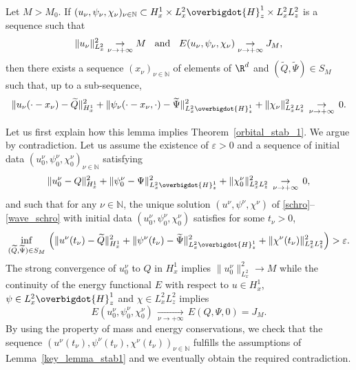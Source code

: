 \begin{lemma}\label{key_lemma_stab1}
Let $M>M_0$.
If $(u_{\nu},\psi_{\nu},\chi_{\nu})_{\nu\in\mathbb N}\subset H_{x}^{1}\times L_{x}^{2}\overbigdot{H}_{z}^{1}\times L_{x}^{2}L_{z}^{2}$ is a sequence such that
\[
\|u_{\nu}\|_{L_{x}^{2}}^{2}\underset{\nu\to+\infty}{\to}M \hspace{0.2cm}\text{ and }\hspace{0.2cm} E(u_{\nu},\psi_{\nu},\chi_{\nu})\underset{\nu\to+\infty}{\to}J_{M},
\]
then there exists a sequence $(x_{\nu})_{\nu\in\mathbb N}$
of elements of
$\R^{d}$ and $(\widetilde{Q},\widetilde{\Psi})\in S_{M}$ such that, up to a sub-sequence,
\[
\|u_{\nu}(\cdot-x_{\nu})-\widetilde{Q}\|_{H_{x}^{1}}^{2}+\|\psi_{\nu}(\cdot-x_{\nu},\cdot)-\widetilde{\Psi}\|_{L_{x}^{2}\overbigdot{H}_{z}^{1}}^{2}+\|\chi_{\nu}\|_{L_{x}^{2}L_{z}^{2}}^{2}\,\underset{\nu\to +\infty}{\to}\,0.
\]
\end{lemma}

Let us first explain how this lemma implies Theorem~\ref{orbital_stab_1}. We argue by contradiction. Let us assume the existence of $\varepsilon>0$ and a sequence of initial data $(u_{0}^{\nu},\psi_{0}^{\nu},\chi_{0}^{\nu})_{\nu\in\mathbb N}$ satisfying
\[
\|u_{0}^{\nu}-Q\|_{H_{x}^{1}}^{2}+\|\psi_{0}^{\nu}-\Psi\|_{L_{x}^{2}\overbigdot{H}_{z}^{1}}^{2}+\|\chi_{0}^{\nu}\|_{L_{x}^{2}L_{z}^{2}}^{2}\,\underset{\nu\to +\infty}{\to}\,0,
\]
and such that for any $\nu\in\mathbb{N}$, the unique solution $(u^{\nu},\psi^{\nu},\chi^{\nu})$ of \eqref{schro}--\eqref{wave_schro}
with initial data $(u_{0}^{\nu},\psi_{0}^{\nu},\chi_{0}^{\nu})$ satisfies for some $t_{\nu}>0$,
\[
\underset{(\widetilde{Q},\widetilde{\Psi})\in S_{M}}{\inf}\,\left(\|u^{\nu}(t_{\nu})-\widetilde{Q}\|_{H_{x}^{1}}^{2}+\|\psi^{\nu}(t_{\nu})-\widetilde{\Psi}\|_{L_{x}^{2}\overbigdot{H}_{z}^{1}}^{2}+\|\chi^{\nu}(t_{\nu})\|_{L_{x}^{2}L_{z}^{2}}^{2}\right)>\varepsilon.
\]
The strong convergence of $u_{0}^{\nu}$ to $Q$ in $H_{x}^{1}$ implies $\|u_{0}^{\nu}\|_{L_{x}^{2}}^{2}\to M$ while the continuity of the energy functional $E$ with respect to $u\in H_{x}^{1}$, $\psi\in L_{x}^{2}\overbigdot{H}_{z}^{1}$ and $\chi\in L_{x}^{2}L_{z}^{2}$ implies
\[
E(u_{0}^{\nu},\psi_{0}^{\nu},\chi_{0}^{\nu})\,\underset{\nu\to+\infty}{\to}\,E(Q,\Psi,0)=J_{M}.
\]
By using the property of mass and energy conservations, we check that the sequence $(u^{\nu}(t_{\nu}) , \psi^{\nu}(t_{\nu}) , \chi^{\nu}(t_{\nu}) )_{\nu\in\mathbb N}$ fulfills the assumptions of Lemma~\ref{key_lemma_stab1} and we eventually obtain the required contradiction.

